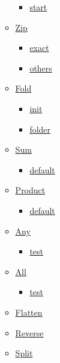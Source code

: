 \begin{itemize}
\begin{itemize}
    \begin{itemize}
    \tightlist
    \item
      \hyperref[definitions-enumerate-start]{start}
    \end{itemize}
  \item
    \hyperref[definitions-zip]{Zip}

    \begin{itemize}
    \tightlist
    \item
      \hyperref[definitions-zip-exact]{exact}
    \item
      \hyperref[definitions-zip-others]{others}
    \end{itemize}
  \item
    \hyperref[definitions-fold]{Fold}

    \begin{itemize}
    \tightlist
    \item
      \hyperref[definitions-fold-init]{init}
    \item
      \hyperref[definitions-fold-folder]{folder}
    \end{itemize}
  \item
    \hyperref[definitions-sum]{Sum}

    \begin{itemize}
    \tightlist
    \item
      \hyperref[definitions-sum-default]{default}
    \end{itemize}
  \item
    \hyperref[definitions-product]{Product}

    \begin{itemize}
    \tightlist
    \item
      \hyperref[definitions-product-default]{default}
    \end{itemize}
  \item
    \hyperref[definitions-any]{Any}

    \begin{itemize}
    \tightlist
    \item
      \hyperref[definitions-any-test]{test}
    \end{itemize}
  \item
    \hyperref[definitions-all]{All}

    \begin{itemize}
    \tightlist
    \item
      \hyperref[definitions-all-test]{test}
    \end{itemize}
  \item
    \hyperref[definitions-flatten]{Flatten}
  \item
    \hyperref[definitions-rev]{Reverse}
  \item
    \hyperref[definitions-split]{Split}


\end{itemize}
\end{itemize}
